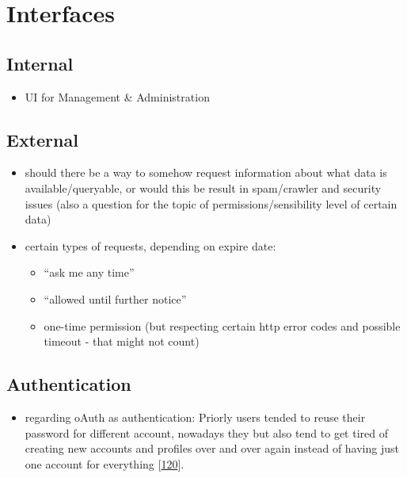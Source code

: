 \documentclass[12pt,english,a4paper,titlepage,cleardoublepage=empty,dottedtoc]{report}
\providecommand{\tightlist}{%
  \setlength{\itemsep}{0pt}\setlength{\parskip}{0pt}}
\begin{document}
\section{Interfaces}\label{interfaces-1}

\subsection{Internal}\label{internal}

\begin{itemize}
\tightlist
\item
  UI for Management \& Administration
\end{itemize}

\subsection{External}\label{external}

\begin{itemize}
\item
  should there be a way to somehow request information about what data
  is available/queryable, or would this be result in spam/crawler and
  security issues (also a question for the topic of
  permissions/sensibility level of certain data)
\item
  certain types of requests, depending on expire date:

  \begin{itemize}
  \tightlist
  \item
    ``ask me any time''
  \item
    ``allowed until further notice''
  \item
    one-time permission (but respecting certain http error codes and
    possible timeout - that might not count)
  \end{itemize}
\end{itemize}

\subsection{Authentication}\label{authentication-1}

\begin{itemize}
\tightlist
\item
  regarding oAuth as authentication: Priorly users tended to reuse their
  password for different account, nowadays they but also tend to get
  tired of creating new accounts and profiles over and over again
  instead of having just one account for everything
  {[}\protect\hyperlink{ref-web_2009-success-of-facebook-connect}{120}{]}.
\end{itemize}
\end{document}

